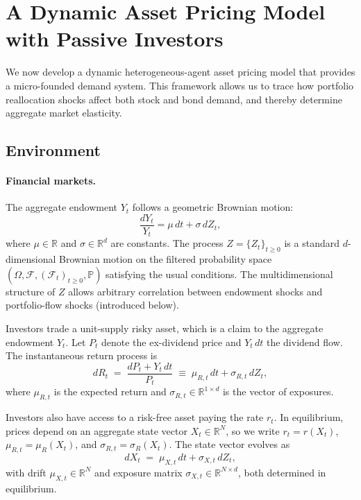 \section{A Dynamic Asset Pricing Model with Passive Investors}\label{sec:model}
We now develop a dynamic heterogeneous-agent asset pricing model that provides a micro-founded demand system. This framework allows us to trace how portfolio reallocation shocks affect both stock and bond demand, and thereby determine aggregate market elasticity.

\subsection{Environment}

\paragraph{Financial markets.}
The aggregate endowment $Y_t$ follows a geometric Brownian motion:
\begin{equation}\label{eq:agg_endow}
    \frac{dY_t}{Y_t} = \mu\,dt + \sigma\,dZ_t,
\end{equation}
where $\mu \in \mathbb{R}$ and $\sigma \in \mathbb{R}^d$ are constants. The process
$Z=\{Z_t\}_{t\ge0}$ is a standard $d$-dimensional Brownian motion on the filtered probability space
$(\Omega,\mathcal{F},(\mathcal{F}_t)_{t\ge0},\mathbb{P})$ satisfying the usual conditions.
The multidimensional structure of $Z$ allows arbitrary correlation between endowment shocks and portfolio-flow shocks (introduced below).

Investors trade a unit-supply risky asset, which is a claim to the aggregate endowment $Y_t$. Let $P_t$ denote the ex-dividend price and $Y_t\,dt$ the dividend flow. The instantaneous return process is
\begin{equation}\label{eq:risky-asset-ret}
    dR_t \;=\; \frac{dP_t + Y_t\,dt}{P_t}
    \;\equiv\; \mu_{R,t}\,dt + \sigma_{R,t}\,dZ_t,
\end{equation}
where $\mu_{R,t}$ is the expected return and $\sigma_{R,t}\in\mathbb{R}^{1\times d}$ is the vector of exposures. 

Investors also have access to a risk-free asset paying the rate $r_t$.
In equilibrium, prices depend on an aggregate state vector $X_t\in\mathbb{R}^N$, so we write $r_t=r(X_t)$, $\mu_{R,t}=\mu_R(X_t)$, and $\sigma_{R,t}=\sigma_R(X_t)$.
The state vector evolves as
\begin{equation}\label{eq:state_dynamics}
    dX_t \;=\; \mu_{X,t}\,dt + \sigma_{X,t}\,dZ_t,
\end{equation}
with drift $\mu_{X,t}\in\mathbb{R}^N$ and exposure matrix $\sigma_{X,t}\in\mathbb{R}^{N\times d}$, both determined in equilibrium.


